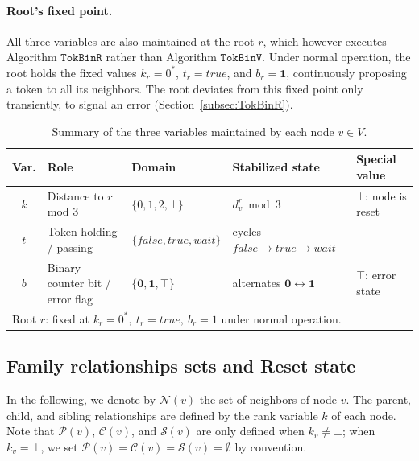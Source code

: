 \documentclass[a4paper, 12pt]{article}
\newcommand{\Neig}{\mathcal{N}}
\newcommand{\Pa}{\mathcal{P}}
\newcommand{\Ch}{\mathcal{C}}
\newcommand{\Si}{\mathcal{S}}
\newcommand{\bz}{\mathbf{0}}
\newcommand{\bo}{\mathbf{1}}
\newcommand{\rk}{k}
\begin{document}
\paragraph*{Root's fixed point.}
All three variables are also maintained at the root $r$, which however executes Algorithm $\mathtt{TokBinR}$ rather than Algorithm $\mathtt{TokBinV}$. Under normal operation, the root holds the fixed values $\rk_r = 0^*$, $t_r = \mathit{true}$, and $b_r = \bo$, continuously proposing a token to all its neighbors. The root deviates from this fixed point only transiently, to signal an error (Section~\ref{subsec:TokBinR}).

\begin{table}[h]
\centering
\renewcommand{\arraystretch}{1.4}
\begin{footnotesize}
\begin{tabular}{c l l l l}
\hline
\textbf{Var.} & \textbf{Role} & \textbf{Domain} & \textbf{Stabilized state} & \textbf{Special value} \\
\hline
$\rk$ & Distance to $r$ mod $3$ & $\{0,1,2,\bot\}$ & $d^r_v \bmod 3$ & $\bot$: node is reset \\
$t$   & Token holding / passing & $\{\mathit{false},\mathit{true},\mathit{wait}\}$ & cycles $\mathit{false}\!\to\!\mathit{true}\!\to\!\mathit{wait}$ & — \\
$b$   & Binary counter bit / error flag & $\{\bz,\bo,\top\}$ & alternates $\bz \leftrightarrow \bo$ & $\top$: error state \\
\hline
\multicolumn{5}{l}{\small Root $r$: fixed at $\rk_r=0^*,\ t_r=\mathit{true},\ b_r=1$ under normal operation.}\\
\hline
\end{tabular}
\end{footnotesize}
\caption{Summary of the three variables maintained by each node $v \in V$.}
\label{tab:variables}
\end{table}


\subsection{Family relationships sets and Reset state}
\label{subsec:family}

In the following, we denote by $\Neig(v)$ the set of neighbors of node $v$. The parent, child, and sibling relationships are defined by the rank variable $\rk$ of each node. Note that $\Pa(v)$, $\Ch(v)$, and $\Si(v)$ are only defined when $\rk_v \neq \bot$; when $\rk_v = \bot$, we set $\Pa(v) = \Ch(v) = \Si(v) = \emptyset$ by convention.
\end{document}
